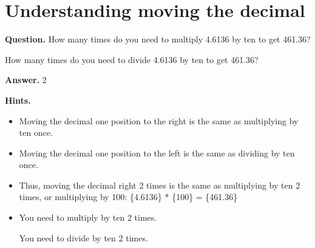 \documentclass{article}
\begin{document}
\section*{Understanding moving the decimal}
\textbf{Question.} How many times do you need to multiply 4.6136 by ten to get 461.36?
                    
                        How many times do you need to divide 4.6136 by ten to get 461.36?

\textbf{Answer.} 2

\textbf{Hints.}
\begin{itemize}
  \item Moving the decimal one position to the right is the same as multiplying by ten once.
  \item Moving the decimal one position to the left is the same as dividing by ten once.
  \item Thus, moving the decimal right 2 times is the same as multiplying by ten 2 times, or multiplying by 100:
                \{4.6136\} * \{100\} = \{461.36\}
  \item You need to multiply by ten 2 times.
                    
                
                    
                        You need to divide by ten 2 times.
\end{itemize}
\end{document}
